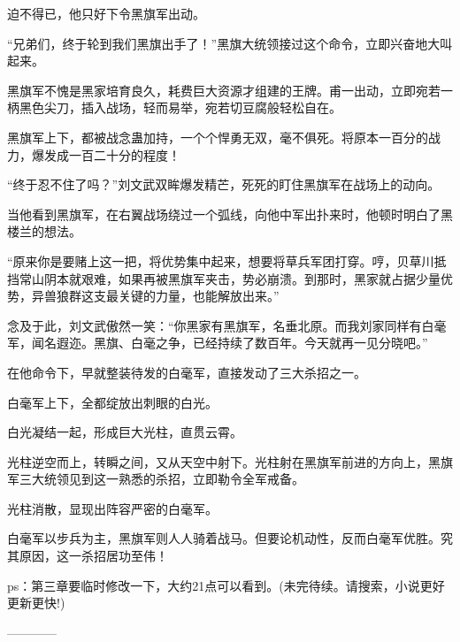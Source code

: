 \begin{this_body}
迫不得已，他只好下令黑旗军出动。

“兄弟们，终于轮到我们黑旗出手了！”黑旗大统领接过这个命令，立即兴奋地大叫起来。

黑旗军不愧是黑家培育良久，耗费巨大资源才组建的王牌。甫一出动，立即宛若一柄黑色尖刀，插入战场，轻而易举，宛若切豆腐般轻松自在。

黑旗军上下，都被战念蛊加持，一个个悍勇无双，毫不俱死。将原本一百分的战力，爆发成一百二十分的程度！

“终于忍不住了吗？”刘文武双眸爆发精芒，死死的盯住黑旗军在战场上的动向。

当他看到黑旗军，在右翼战场绕过一个弧线，向他中军出扑来时，他顿时明白了黑楼兰的想法。

“原来你是要赌上这一把，将优势集中起来，想要将草兵军团打穿。哼，贝草川抵挡常山阴本就艰难，如果再被黑旗军夹击，势必崩溃。到那时，黑家就占据少量优势，异兽狼群这支最关键的力量，也能解放出来。”

念及于此，刘文武傲然一笑：“你黑家有黑旗军，名垂北原。而我刘家同样有白毫军，闻名遐迩。黑旗、白毫之争，已经持续了数百年。今天就再一见分晓吧。”

在他命令下，早就整装待发的白毫军，直接发动了三大杀招之一。

白毫军上下，全都绽放出刺眼的白光。

白光凝结一起，形成巨大光柱，直贯云霄。

光柱逆空而上，转瞬之间，又从天空中射下。光柱射在黑旗军前进的方向上，黑旗军三大统领见到这一熟悉的杀招，立即勒令全军戒备。

光柱消散，显现出阵容严密的白毫军。

白毫军以步兵为主，黑旗军则人人骑着战马。但要论机动性，反而白毫军优胜。究其原因，这一杀招居功至伟！

ps：第三章要临时修改一下，大约21点可以看到。(未完待续。请搜索，小说更好更新更快!)

------------

\end{this_body}

